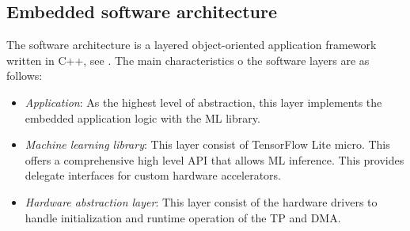 \subsection{\textbf{Embedded software architecture}}
The software architecture is a layered object-oriented application framework written in C++, see . The main characteristics o the software layers are as follows:
\begin{itemize}
	\item \emph{Application}: As the highest level of abstraction, this layer implements the embedded application logic with the ML library.
	\item \emph{Machine learning library}: This layer consist of TensorFlow Lite micro. This offers a comprehensive high level API that allows ML inference. This provides delegate interfaces for custom hardware accelerators.
	\item \emph{Hardware abstraction layer}: This layer consist of the hardware drivers to handle initialization and runtime operation of the TP and DMA.
\end{itemize}